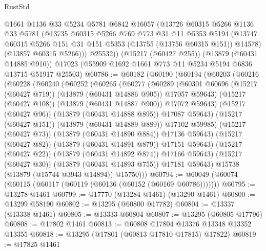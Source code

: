 \begin{lexlean}{RustStd}
\begin{coremodule}
        @1661
        @1136
        @33
        @5234
        @5781
        @6842
        @16057
        (@13726
          @60315
          @5266
          @1136
          @33
          @5781
          (@13735
            @60315
            @5266
            @769
            @773
            @31
            @11
            @5353
            @5194
            (@13747 @60315 @5266 @151 @31 @151 @5353 (@13755 (@13756 @60315 @151)) @14578)
            (@13857 @60315 @5266)))
        @25532))
    (@15217 (@60427 @255))
    (@13879 (@60431 @14885 @910))
    @17023
    (@55909 @1692 @1661 @773 @11 @5234 @5194 @6836 @13715 @51917 @25503)
@60786 := @60182
    (@60190
      (@60194
        (@60203
          (@60216
            (@60228
              (@60240
                (@60252
                  (@60265
                    (@60277
                      (@60289
                        (@60301
                          @60696
                          (@15217 (@60427 @719))
                          (@13879 (@60431 @14886 @905))
                          @17057
                          @59643)
                        (@15217 (@60427 @108))
                        (@13879 (@60431 @14887 @900))
                        @17072
                        @59643)
                      (@15217 (@60427 @96))
                      (@13879 (@60431 @14888 @895))
                      @17087
                      @59643)
                    (@15217 (@60427 @151))
                    (@13879 (@60431 @14889 @889))
                    @17102
                    @59985)
                  (@15217 (@60427 @73))
                  (@13879 (@60431 @14890 @884))
                  @17136
                  @59643)
                (@15217 (@60427 @82))
                (@13879 (@60431 @14891 @879))
                @17151
                @59643)
              (@15217 (@60427 @22))
              (@13879 (@60431 @14892 @874))
              @17166
              @59643)
            (@15217 (@60427 @30))
            (@13879 (@60431 @14893 @755))
            @17181
            @59643)
          @15738
          (@13879 (@15744 @3943 @14894))
          @15750)))
@60794 := @60049 (@60074 (@60115 (@60117 (@60119 (@60136 (@60152 (@60169 @60786)))))))
@60795 := @13278 @1461
@60799 := @17770 (@13284 @1461) (@13290 @1461)
@60800 := @13299 @58190
@60802 := @13295 (@60800 @17782)
@60804 := @13337 (@13338 @1461)
@60805 := @13333 @60804
@60807 := @13295 (@60805 @17796)
@60808 := @17802 @1461
@60813 := @60808 @17804 @13376 @13348 @13352 @13355
@60818 := @13295 (@17801 (@60813 @17810 @17815) @17822)
@60819 := @17825 @1461

\end{coremodule}
\end{lexlean}
